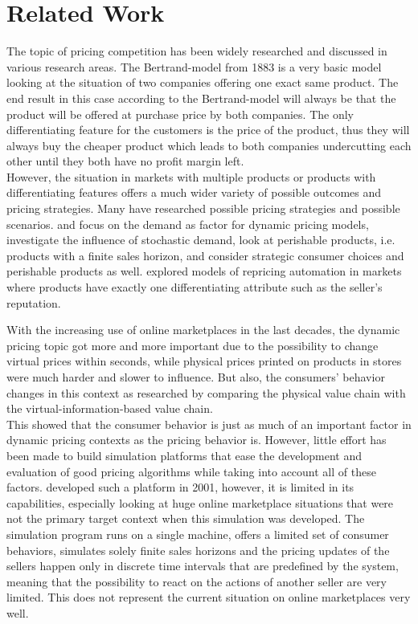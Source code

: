 %
\section{Related Work}
\label{sec:Related_Work}
%
The topic of pricing competition has been widely researched and discussed in various research areas. The Bertrand-model from 1883 \citep{bertrand1883} is a very basic model looking at the situation of two companies offering one exact same product. The end result in this case according to the Bertrand-model will always be that the product will be offered at purchase price by both companies. The only differentiating feature for the customers is the price of the product, thus they will always buy the cheaper product which leads to both companies undercutting each other until they both have no profit margin left. \\

However, the situation in markets with multiple products or products with differentiating features offers a much wider variety of possible outcomes and pricing strategies. Many have researched possible pricing strategies and possible scenarios. \citet{kopalle1996} and \citet{chintagunta1996} focus on the demand as factor for dynamic pricing models, \citet{martinez2011} investigate the influence of stochastic demand, \citet{gallego2008} look at perishable products, i.e. products with a finite sales horizon, and \citet{levin2009} consider strategic consumer choices and perishable products as well. \citet{popescu2015} explored models of repricing automation in markets where products have exactly one differentiating attribute such as the seller's reputation. 

With the increasing use of online marketplaces in the last decades, the dynamic pricing topic got more and more important due to the possibility to change virtual prices within seconds, while physical prices printed on products in stores were much harder and slower to influence. But also, the consumers' behavior changes in this context as \citet{kannan2001} researched by comparing the physical value chain with the virtual-information-based value chain. \\

This showed that the consumer behavior is just as much of an important factor in dynamic pricing contexts as the pricing behavior is. However, little effort has been made to build simulation platforms that ease the development and evaluation of good pricing algorithms while taking into account all of these factors. \citet{morris2001} developed such a platform in 2001, however, it is limited in its capabilities, especially looking at huge online marketplace situations that were not the primary target context when this simulation was developed. The simulation program runs on a single machine, offers a limited set of consumer behaviors, simulates solely finite sales horizons and the pricing updates of the sellers happen only in discrete time intervals that are predefined by the system, meaning that the possibility to react on the actions of another seller are very limited. This does not represent the current situation on online marketplaces very well.

